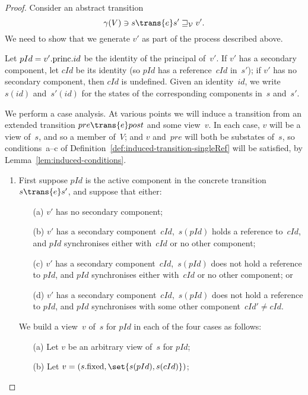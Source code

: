 \begin{proof}
Consider an abstract transition
\[
\gamma(V) \ni s \trans{e} s' \sqge_{\V} v'.
\]
We need to show that we generate $v'$ as part of the process described above.

Let $pId = v'.\mathrm{princ}.id$ be the identity of the principal of~$v'$.  If $v'$
has a secondary component, let $cId$ be its identity (so $pId$ has a
reference~$cId$ in~$s'$); if $v'$ has no secondary component, then $cId$ is
undefined.  Given an identity~$id$, we write $s(id)$ and~$s'(id)$ for the
states of the corresponding components in~$s$ and~$s'$.

We perform a case analysis.  At various points we will induce a transition
from an extended transition $pre \trans{e} post$ and some view~$v$.  In each
case, $v$ will be a view of~$s$, and so a member of~$V$; and $v$ and~$pre$
will both be substates of~$s$, so conditions~a--c of
Definition~\ref{def:induced-transition-singleRef} will be satisfied, by
Lemma~\ref{lem:induced-conditions}.
%
\begin{enumerate}
\item
First suppose $pId$ is the active component in the concrete transition \( {s
  \trans{e} s'} \), and suppose that either: 
\begin{enumerate}
\item[(a)] $v'$ has no secondary component; 

\item[(b)] $v'$ has a secondary component~$cId$,\, $s(pId)$ holds a reference
  to~$cId$, and $pId$ synchronises either with~$cId$ or no other component;
  
\item[(c)] $v'$ has a secondary component~$cId$,\, $s(pId)$ does not hold a
  reference to $pId$, and $pId$ synchronises either with~$cId$ or no other
  component; or

\item[(d)] $v'$ has a secondary component~$cId$,\, $s(pId)$ does not
  hold a reference to $pId$, and $pId$ synchronises with some other
  component~$cId' \ne cId$.
\end{enumerate}

We build a view~$v$ of~$s$ for $pId$ in each of the four cases as follows:
\begin{enumerate}
\item[(a)] Let $v$ be an arbitrary view of~$s$ for $pId$;

\item[(b)] Let $v = (s.\fixed, \set{s(pId), s(cId)})$;


\end{enumerate}
\end{enumerate}
\end{proof}
